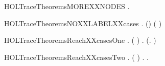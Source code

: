 \begin{SaveVerbatim}{HOLTraceTheoremsMOREXXNODES}
\HOLTokenTurnstile{} \HOLSymConst{\HOLTokenForall{}}  .  \HOLConst{\HOLTokenIn{}}   \HOLSymConst{\HOLTokenConj{}}    \HOLSymConst{\HOLTokenImp{}}  \HOLConst{\HOLTokenIn{}}  
\end{SaveVerbatim}
\newcommand{\HOLTraceTheoremsMOREXXNODES}{\UseVerbatim{HOLTraceTheoremsMOREXXNODES}}
\begin{SaveVerbatim}{HOLTraceTheoremsNOXXLABELXXcases}
\HOLTokenTurnstile{} \HOLSymConst{\HOLTokenForall{}} .  (\HOLSymConst{::}) \HOLSymConst{\HOLTokenEquiv{}} ( \HOLSymConst{=} \HOLConst{\ensuremath{\tau}}) \HOLSymConst{\HOLTokenConj{}}  
\end{SaveVerbatim}
\newcommand{\HOLTraceTheoremsNOXXLABELXXcases}{\UseVerbatim{HOLTraceTheoremsNOXXLABELXXcases}}
\begin{SaveVerbatim}{HOLTraceTheoremsReachXXcasesOne}
\HOLTokenTurnstile{} \HOLSymConst{\HOLTokenForall{}} .    \HOLSymConst{\HOLTokenEquiv{}} ( \HOLSymConst{=} ) \HOLSymConst{\HOLTokenDisj{}} \HOLSymConst{\HOLTokenExists{}}. (\HOLSymConst{\HOLTokenExists{}}.  \HOLTokenTransBegin{}\HOLTokenTransEnd {}) \HOLSymConst{\HOLTokenConj{}}   
\end{SaveVerbatim}
\newcommand{\HOLTraceTheoremsReachXXcasesOne}{\UseVerbatim{HOLTraceTheoremsReachXXcasesOne}}
\begin{SaveVerbatim}{HOLTraceTheoremsReachXXcasesTwo}
\HOLTokenTurnstile{} \HOLSymConst{\HOLTokenForall{}} .    \HOLSymConst{\HOLTokenEquiv{}} ( \HOLSymConst{=} ) \HOLSymConst{\HOLTokenDisj{}} \HOLSymConst{\HOLTokenExists{}}.    \HOLSymConst{\HOLTokenConj{}} \HOLSymConst{\HOLTokenExists{}}.  \HOLTokenTransBegin{}\HOLTokenTransEnd {}
\end{SaveVerbatim}
